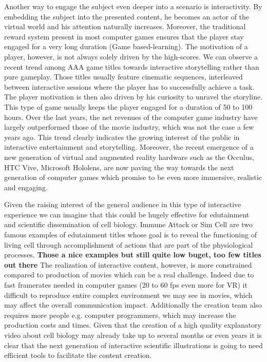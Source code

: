 Another way to engage the subject even deeper into a scenario is interactivity.
By embedding the subject into the presented content, he becomes an actor of the virtual world and his attention naturally increases. 
Moreover, the traditional reward system present in most computer games ensures that the player stay engaged for a very long duration (Game based-learning).
The motivation of a player, however, is not always solely driven by the high-scores.
We can observe a recent trend among AAA game titles towards interactive storytelling rather than pure gameplay.
Those titles usually feature cinematic sequences, interleaved between interactive sessions where the player has to successfully achieve a task.
The player motivation is then also driven by his curiosity to unravel the storyline.
This type of game usually keeps the player engaged for a duration of 50 to 100 hours.
Over the last years, the net revenues of the computer game industry have largely outperformed those of the movie industry, which was not the case a few years ago.
This trend clearly indicates the growing interest of the public in interactive entertainment and  storytelling. 
Moreover, the recent emergence of a new generation of virtual and augmented reality hardware such as the Occulus, HTC Vive, Microsoft Hololens, are now paving the way towards the next generation of computer games which promise to be even more immersive, realistic and engaging.

Given the raising interest of the general audience in this type of interactive experience we can imagine that this could be hugely effective for edutainment and scientific dissemination of cell biology.
Immune Attack or Sim Cell are two famous examples of edutainment titles whose goal is to reveal the functioning of living cell through accomplishment of actions that are part of the physiological processes.
\textbf{Those a nice examples but still quite low buget, too few titles out there}
The realization of interactive content, however, is more constrained compared to production of movies which can be a real challenge. Indeed due to fast framerates needed in computer games (20 to 60 fps even more for VR) it difficult to reproduce entire complex environment we may see in movies, which may affect the overall communication impact. 
Additionally the creation team also requires more people e.g. computer programmers, which may increase the production costs and times. 
Given that the creation of a high quality explanatory video about cell biology may already take up to several months or even years it is clear that the next generation of interactive scientific illustrations is going to need efficient tools to facilitate the content creation.

